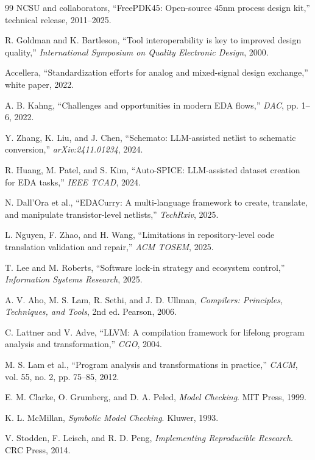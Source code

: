 \documentclass[12pt,a4paper,oneside]{report}
\begin{document}
\begin{thebibliography}{99}
NCSU and collaborators, ``FreePDK45: Open-source 45nm process design kit,'' technical release, 2011--2025.

R. Goldman and K. Bartleson, ``Tool interoperability is key to improved design quality,'' \emph{International Symposium on Quality Electronic Design}, 2000.

Accellera, ``Standardization efforts for analog and mixed-signal design exchange,'' white paper, 2022.

A. B. Kahng, ``Challenges and opportunities in modern EDA flows,'' \emph{DAC}, pp. 1--6, 2022.

Y. Zhang, K. Liu, and J. Chen, ``Schemato: LLM-assisted netlist to schematic conversion,'' \emph{arXiv:2411.01234}, 2024.

R. Huang, M. Patel, and S. Kim, ``Auto-SPICE: LLM-assisted dataset creation for EDA tasks,'' \emph{IEEE TCAD}, 2024.

N. Dall'Ora et al., ``EDACurry: A multi-language framework to create, translate, and manipulate transistor-level netlists,'' \emph{TechRxiv}, 2025.

L. Nguyen, F. Zhao, and H. Wang, ``Limitations in repository-level code translation validation and repair,'' \emph{ACM TOSEM}, 2025.

T. Lee and M. Roberts, ``Software lock-in strategy and ecosystem control,'' \emph{Information Systems Research}, 2025.

A. V. Aho, M. S. Lam, R. Sethi, and J. D. Ullman, \emph{Compilers: Principles, Techniques, and Tools}, 2nd ed. Pearson, 2006.

C. Lattner and V. Adve, ``LLVM: A compilation framework for lifelong program analysis and transformation,'' \emph{CGO}, 2004.

M. S. Lam et al., ``Program analysis and transformations in practice,'' \emph{CACM}, vol. 55, no. 2, pp. 75--85, 2012.

E. M. Clarke, O. Grumberg, and D. A. Peled, \emph{Model Checking}. MIT Press, 1999.

K. L. McMillan, \emph{Symbolic Model Checking}. Kluwer, 1993.

V. Stodden, F. Leisch, and R. D. Peng, \emph{Implementing Reproducible Research}. CRC Press, 2014.


\end{thebibliography}
\end{document}
